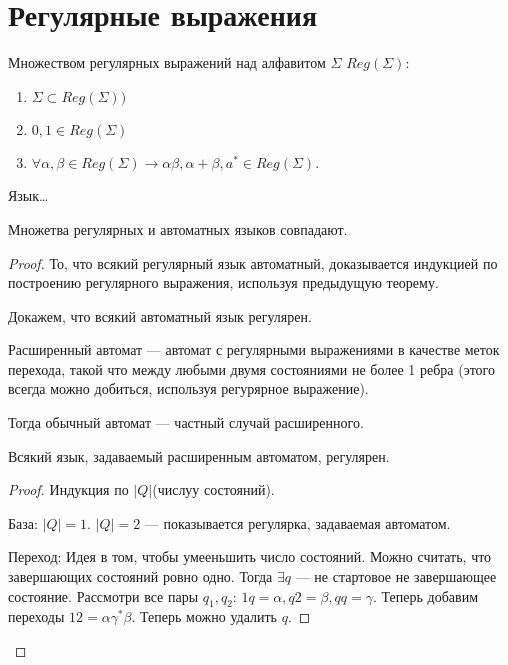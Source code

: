 \section*{Регулярные выражения}

\begin{define*}
  Множеством регулярных выражений над алфавитом $\Sigma$ $Reg(\Sigma)$:
  \begin{enumerate}
	\item $\Sigma \subset Reg(\Sigma))$
	\item $0, 1 \in Reg(\Sigma)$
	\item $\forall \alpha, \beta \in Reg(\Sigma) \to \alpha\beta, \alpha + \beta, a^* \in Reg(\Sigma)$.
  \end{enumerate}
\end{define*}

\begin{define*}
  Язык\ldots
\end{define*}

\begin{Th}
  Множетва регулярных и автоматных языков совпадают.

  \begin{proof}
	То, что всякий регулярный язык автоматный, доказывается индукцией по построению регулярного выражения, используя предыдущую теорему.

	Докажем, что всякий автоматный язык регулярен.
	\begin{define*}[неформальное]
	  Расширенный автомат --- автомат с регулярными выражениями в качестве меток перехода, такой что между любыми двумя состояниями не более 1 ребра
	  (этого всегда можно добиться, используя регурярное выражение). 
	\end{define*}

	\begin{remark*}
	  Тогда обычный автомат --- частный случай расширенного.
	\end{remark*}

	\begin{lem}
	  Всякий язык, задаваемый расширенным автоматом, регулярен.
	  \begin{proof}
		Индукция по $|Q|$(числуу состояний).

		База: $|Q| = 1$. $|Q| = 2$ --- показывается регулярка, задаваемая автоматом.

		Переход: Идея в том, чтобы умееньшить число состояний. Можно считать, что завершающих состояний ровно одно. 
		Тогда $\exists q$ --- не стартовое не завершающее состояние. Рассмотри все пары $q_1, q_2$: $1q = \alpha, q2 = \beta, qq = \gamma$.
		Теперь добавим переходы $12 = \alpha\gamma^*\beta$. Теперь можно удалить $q$.
	  \end{proof}
	\end{lem}
  \end{proof}
\end{Th}

